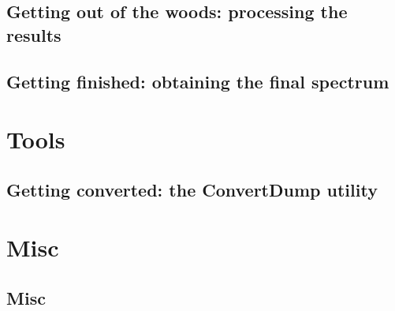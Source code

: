 \documentclass[a4paper,fleqn]{report}
\begin{document}
	\chapter{Getting out of the woods: processing the results}
	
	
	\chapter{Getting finished: obtaining the final spectrum}
	
	
	\part{Tools}
	\chapter{Getting converted: the ConvertDump utility}
	
	
	\part{Misc}
	\chapter{Misc}
	
	
	\newpage
	\begin{spacing}{0.75}
		\label{Referenties}
		\clearpage
		\renewcommand{\bibname}{Referenties}
		
	\end{spacing}
\end{document}
